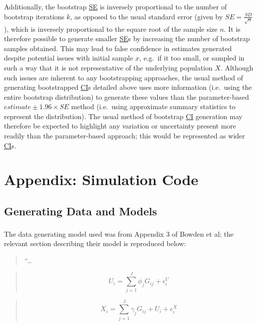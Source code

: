 \documentclass[
]{article}
\begin{document}
Additionally, the bootstrap \hyperref[acronyms_SE]{SE} is inversely proportional to the number of bootstrap iterations \(k\), as opposed to the usual standard error (given by \(SE = \frac{SD}{\sqrt{n}}\)), which is inversely proportional to the square root of the sample size \(n\). It is therefore possible to generate smaller \hyperref[acronyms_SE]{SE}s by increasing the number of bootstrap samples obtained. This may lead to false confidence in estimates generated despite potential issues with initial sample \(x\), e.g.~if it too small, or sampled in such a way that it is not representative of the underlying population \(X\). Although such issues are inherent to any bootstrapping approaches, the usual method of generating bootstrapped \hyperref[acronyms_CI]{CI}s detailed above uses more information (i.e.~using the entire bootstrap distribution) to generate these values than the parameter-based \(estimate \pm 1.96 \times SE\) method (i.e.~using approximate summary statistics to represent the distribution). The usual method of bootstrap \hyperref[acronyms_CI]{CI} generation may therefore be expected to highlight any variation or uncertainty present more readily than the parameter-based approach; this would be represented as wider \hyperref[acronyms_CI]{CI}s.

\newpage

\section{Appendix: Simulation Code}\label{appendix-sim}

\subsection{Generating Data and Models}\label{appendix-sim-gen}

The data generating model used was from Appendix 3 of Bowden et al\textsuperscript{}; the relevant section describing their model is reproduced below:

\begin{quote}
\emph{``\ldots{}}
\end{quote}

\begin{quote}
\begin{equation} 
U_i = \sum^J_{j=1} \phi_jG_{ij} + \epsilon_i^U
\end{equation}
\end{quote}

\begin{quote}
\begin{equation} 
X_i = \sum^J_{j=1} \gamma_jG_{ij} + U_i + \epsilon_i^X
\end{equation}
\end{quote}
\end{document}
